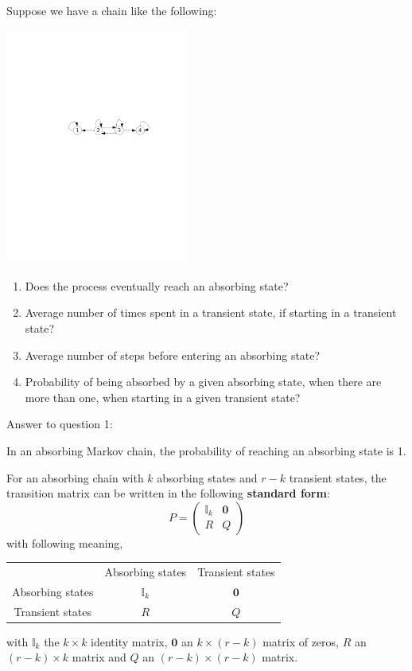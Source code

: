 Suppose we have a chain like the following:
\begin{center}
\includegraphics[width=0.45\textwidth]{../figs_08_genetics/graphe_absorbant}
\end{center}
\begin{enumerate}
\item Does the process eventually reach an absorbing state?
\item Average number of times spent in a transient state, if starting in a transient state?
\item Average number of steps before entering an absorbing state?
\item Probability of being absorbed by a given absorbing state, when there are more than one, when starting in a given transient state?
\end{enumerate}

Answer to question 1:
\begin{theorem}
In an absorbing Markov chain, the probability of reaching an absorbing state is 1.
\end{theorem}

For an absorbing chain with $k$ absorbing states and $r-k$ transient states, the transition matrix can be written in the following \textbf{standard form}:
\[
P=\begin{pmatrix}
\mathbb{I}_k & \mathbf{0} \\
R & Q
\end{pmatrix}
\]
with following meaning,
\begin{center}
\begin{tabular}{ccc}
& Absorbing states & Transient states \\
Absorbing states & $\mathbb{I}_k$ & $\mathbf{0}$ \\
Transient states & $R$ & $Q$
\end{tabular}
\end{center}
with $\mathbb{I}_k$ the $k\times k$ identity matrix, $\mathbf{0}$ an $k\times(r-k)$ matrix of zeros, $R$ an $(r-k)\times k$ matrix and $Q$ an $(r-k)\times(r-k)$ matrix.


